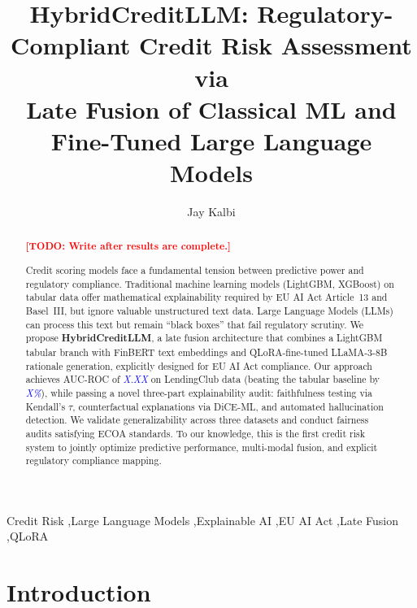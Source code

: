 \documentclass[preprint,12pt]{elsarticle}
\newcommand{\TODO}[1]{\textcolor{red}{\textbf{[TODO: #1]}}}
\newcommand{\PLACEHOLDER}[1]{\textcolor{blue}{\textit{#1}}}
\begin{document}
\begin{frontmatter}

\title{HybridCreditLLM: Regulatory-Compliant Credit Risk Assessment via\\
Late Fusion of Classical ML and Fine-Tuned Large Language Models}

\author[inst1]{Jay Kalbi}
\address[inst1]{Independent Researcher}

\begin{abstract}
\TODO{Write after results are complete.}

Credit scoring models face a fundamental tension between predictive power and regulatory compliance. Traditional machine learning models (LightGBM, XGBoost) on tabular data offer mathematical explainability required by EU AI Act Article~13 and Basel~III, but ignore valuable unstructured text data. Large Language Models (LLMs) can process this text but remain ``black boxes'' that fail regulatory scrutiny. We propose \textbf{HybridCreditLLM}, a late fusion architecture that combines a LightGBM tabular branch with FinBERT text embeddings and QLoRA-fine-tuned LLaMA-3-8B rationale generation, explicitly designed for EU AI Act compliance. Our approach achieves AUC-ROC of \PLACEHOLDER{X.XX} on LendingClub data (beating the tabular baseline by \PLACEHOLDER{X\%}), while passing a novel three-part explainability audit: faithfulness testing via Kendall's $\tau$, counterfactual explanations via DiCE-ML, and automated hallucination detection. We validate generalizability across three datasets and conduct fairness audits satisfying ECOA standards. To our knowledge, this is the first credit risk system to jointly optimize predictive performance, multi-modal fusion, and explicit regulatory compliance mapping.

\end{abstract}

\begin{keyword}
Credit Risk \sep Large Language Models \sep Explainable AI \sep EU AI Act \sep Late Fusion \sep QLoRA
\end{keyword}

\end{frontmatter}

\section{Introduction}
\label{sec:introduction}
\end{document}
